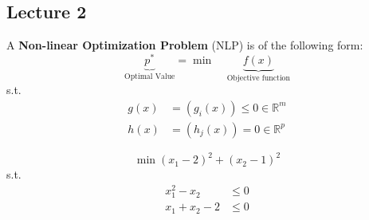 
% 
\subsection{Lecture 2}
\begin{definition}
    A \textbf{Non-linear Optimization Problem} (NLP) is of the following form:
    $$\underbrace{p^*}_{\text{Optimal Value}} = \min\;\;\;\; \underbrace{f(x)}_{\text{Objective function}}$$
    s.t.
    \begin{align*}
        g(x) &= (g_i(x)) \leq 0 \in \mathbb R^m \\
        h(x) &= (h_j(x)) = 0 \in \mathbb R^p
    \end{align*}
\end{definition}
\begin{problem}[Example]
    $$\min (x_1 - 2)^2 + (x_2 - 1)^2$$
    s.t.
    \begin{align*}
        x_1^2 - x_2 &\leq 0 \tag{$g_1(x) \leq 0$}\\
        x_1 + x_2 - 2 &\leq 0 \tag{$g_2(x) \leq 0$}
    \end{align*}
\end{problem}

